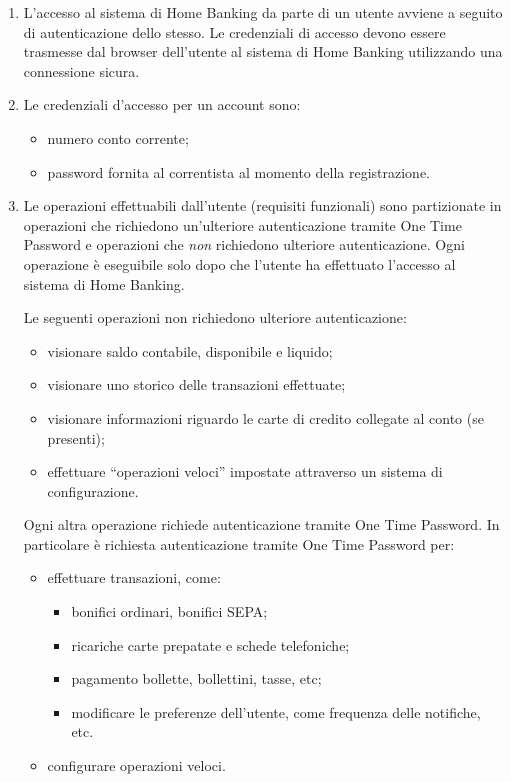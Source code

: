 \begin{enumerate}
	\item \label{itm:utente:non-funzionali:sicurezza:accesso} L'accesso al sistema di Home Banking da parte di un utente avviene a seguito di autenticazione dello stesso.
		Le credenziali di accesso devono essere trasmesse dal browser dell'utente al sistema di Home Banking utilizzando una connessione sicura.
	\item \label{itm:utente:non-funzionali:sicurezza:credenziali} Le credenziali d'accesso per un account sono:
		\begin{itemize}
			\item numero conto corrente;
			\item password fornita al correntista al momento della registrazione.
		\end{itemize}
	\item \label{itm:utente:non-funzionali:sicurezza:operazioni} Le operazioni effettuabili dall'utente (requisiti funzionali) sono partizionate in operazioni che richiedono un'ulteriore autenticazione tramite One Time Password e operazioni che \emph{non} richiedono ulteriore autenticazione.
	Ogni operazione \`e eseguibile solo dopo che l'utente ha effettuato l'accesso al sistema di Home Banking.

	Le seguenti operazioni non richiedono ulteriore autenticazione:
	\begin{itemize}
		\item visionare saldo contabile, disponibile e liquido;
		\item visionare uno storico delle transazioni effettuate;
		\item visionare informazioni riguardo le carte di credito collegate al conto (se presenti);
		\item effettuare ``operazioni veloci'' impostate attraverso un sistema di configurazione.
	\end{itemize}

	Ogni altra operazione richiede autenticazione tramite One Time Password.
	In particolare \`e richiesta autenticazione tramite One Time Password per:
	\begin{itemize}
		\item effettuare transazioni, come:
		\begin{itemize}
			\item bonifici ordinari, bonifici SEPA;
			\item ricariche carte prepatate e schede telefoniche;
			\item pagamento bollette, bollettini, tasse, etc;
			\item modificare le preferenze dell'utente, come frequenza delle notifiche, etc.
		\end{itemize}
		\item configurare operazioni veloci.
	\end{itemize}
\end{enumerate}

